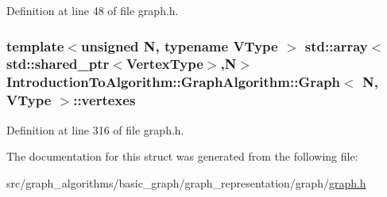 Definition at line 48 of file graph.\+h.

\hypertarget{struct_introduction_to_algorithm_1_1_graph_algorithm_1_1_graph_aea254564996a6a172f001ebf7f3c5f65}{}
\subsubsection[{vertexes}]{\setlength{\rightskip}{0pt plus 5cm}template$<$unsigned N, typename V\+Type $>$ std\+::array$<$std\+::shared\+\_\+ptr$<${\bf Vertex\+Type}$>$,N$>$ {\bf Introduction\+To\+Algorithm\+::\+Graph\+Algorithm\+::\+Graph}$<$ N, V\+Type $>$\+::vertexes}\label{struct_introduction_to_algorithm_1_1_graph_algorithm_1_1_graph_aea254564996a6a172f001ebf7f3c5f65}


Definition at line 316 of file graph.\+h.



The documentation for this struct was generated from the following file\+:\begin{DoxyCompactItemize}
\item 
src/graph\+\_\+algorithms/basic\+\_\+graph/graph\+\_\+representation/graph/\hyperlink{graph_8h}{graph.\+h}\end{DoxyCompactItemize}
